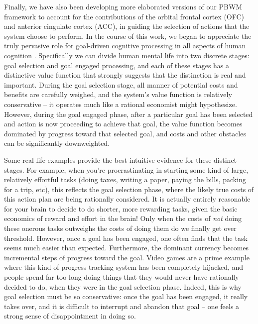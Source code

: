 \documentclass[11pt,twoside]{article}
\newif\myifpdf
\begin{document}
Finally, we have also been developing more elaborated versions of our PBWM framework to account for the contributions of the orbital frontal cortex (OFC) and anterior cingulate cortex (ACC), in guiding the selection of actions that the system choose to perform.  In the course of this work, we began to appreciate the truly pervasive role for goal-driven cognitive processing in all aspects of human cognition \cite{OReillyHazyMollickEtAl14}.  Specifically we can divide human mental life into two discrete stages: goal selection and goal engaged processing, and each of these stages has a distinctive value function that strongly suggests that the distinction is real and important.  During the goal selection stage, all manner of potential costs and benefits are carefully weighed, and the system's value function is relatively conservative -- it operates much like a rational economist might hypothesize.  However, during the goal engaged phase, after a particular goal has been selected and action is now proceeding to achieve that goal, the value function becomes dominated by progress toward that selected goal, and costs and other obstacles can be significantly downweighted.

Some real-life examples provide the best intuitive evidence for these distinct stages.  For example, when you're procrastinating in starting some kind of large, relatively effortful tasks (doing taxes, writing a paper, paying the bills, packing for a trip, etc), this reflects the goal selection phase, where the likely true costs of this action plan are being rationally considered.  It is actually entirely reasonable for your brain to decide to do shorter, more rewarding tasks, given the basic economics of reward and effort in the brain!  Only when the costs of {\em not} doing these onerous tasks outweighs the costs of doing them do we finally get over threshold.  However, once a goal has been engaged, one often finds that the task seems much easier than expected.  Furthermore, the dominant currency becomes incremental steps of progress toward the goal.  Video games are a prime example where this kind of progress tracking system has been completely hijacked, and people spend far too long doing things that they would never have rationally decided to do, when they were in the goal selection phase.  Indeed, this is why goal selection must be so conservative: once the goal has been engaged, it really takes over, and it is difficult to interrupt and abandon that goal -- one feels a strong sense of disappointment in doing so.
\end{document}
